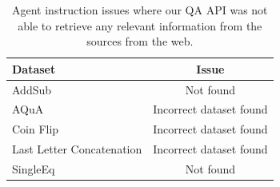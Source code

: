 
\begin{table}[ht!]
\caption{Agent instruction issues where our QA API was not able to retrieve any relevant information from the sources from the web.
}
\label{table:instruction-analysis}
\vskip 0.1in

\centering


\begin{tabular}{lc}

\toprule
Dataset & Issue \\ \midrule

AddSub & Not found \\
AQuA & Incorrect dataset found\\
Coin Flip & Incorrect dataset found \\
Last Letter Concatenation & Incorrect dataset found \\
SingleEq & Not found \\

\bottomrule
\end{tabular}%



\end{table}